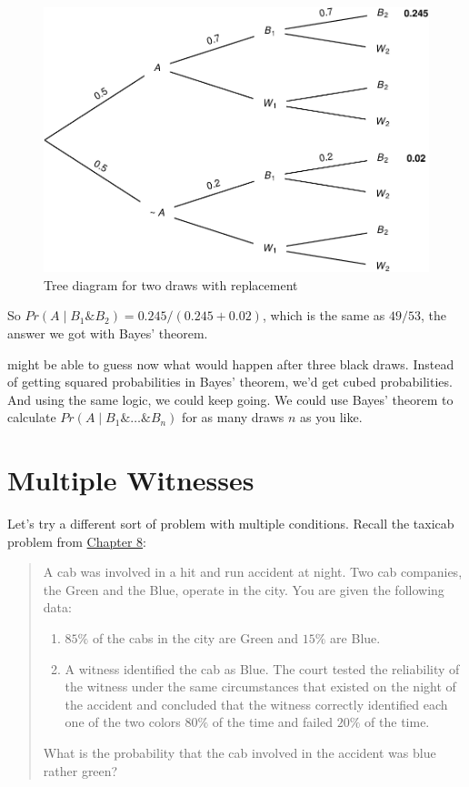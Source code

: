 \documentclass[justified]{tufte-book}
\providecommand{\tightlist}{%
  \setlength{\itemsep}{0pt}\setlength{\parskip}{0pt}}
\newcommand{\given}{\mid}
\renewcommand{\wedge}{\mathbin{\&}}
\newcommand{\p}{Pr}
\newenvironment{problem}{\begin{quote}\normalsize}{\end{quote}}
\theoremstyle{definition}
\theoremstyle{definition}
\theoremstyle{definition}
\theoremstyle{definition}
\theoremstyle{remark}
\begin{document}
\begin{figure}
\includegraphics{_main_files/figure-latex/twodrawsreplacement-1} \caption[Tree diagram for two draws with replacement]{Tree diagram for two draws with replacement}\label{fig:twodrawsreplacement}
\end{figure}

So \(\p(A \given B_1 \wedge B_2) = 0.245 / (0.245 + 0.02)\), which is the same as \(49/53\), the answer we got with Bayes' theorem.

 might be able to guess now what would happen after three black draws. Instead of getting squared probabilities in Bayes' theorem, we'd get cubed probabilities. And using the same logic, we could keep going. We could use Bayes' theorem to calculate \(\p(A \given B_1 \wedge \ldots \wedge B_n)\) for as many draws \(n\) as you like.

\hypertarget{multiple-witnesses}{%
\section{Multiple Witnesses}\label{multiple-witnesses}}

Let's try a different sort of problem with multiple conditions. Recall the taxicab problem from \protect\hyperlink{chbayes}{Chapter 8}:

\begin{problem}
A cab was involved in a hit and run accident at night. Two cab companies, the Green and the Blue, operate in the city. You are given the following data:

\begin{enumerate}
\def\labelenumi{\arabic{enumi}.}
\tightlist
\item
  \(85\%\) of the cabs in the city are Green and \(15\%\) are Blue.
\item
  A witness identified the cab as Blue. The court tested the reliability of the witness under the same circumstances that existed on the night of the accident and concluded that the witness correctly identified each one of the two colors \(80\%\) of the time and failed \(20\%\) of the time.
\end{enumerate}

What is the probability that the cab involved in the accident was blue rather green?
\end{problem}
\end{document}
